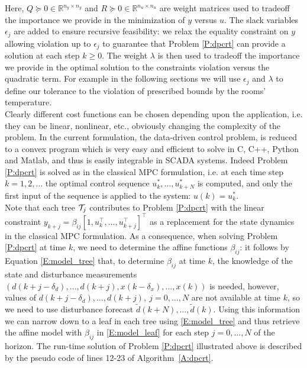 \textcolor[rgb]{0,0,1}{Here, $Q \succeq 0 \in \mathbb{R}^{n_y\times n_y}$ and $R \succeq 0 \in \mathbb{R}^{n_u\times n_u}$ are weight matrices used to tradeoff the importance we provide in the minimization of $y$ versus $u$. The slack variables $\epsilon_j$ are added to ensure recursive feasibility: we relax the equality constraint on $y$ allowing violation up to $\epsilon_j$ to guarantee that Problem \ref{P:dpcrt} can provide a solution at each step $k \geq 0$. The weight $\lambda$ is then used to tradeoff the importance we provide in the optimal solution to the constraints violation versus the quadratic term. For example in the following sections we will use $\epsilon_j$ and $\lambda$ to define our tolerance to the violation of prescribed bounds by the rooms' temperature.\\
Clearly different cost functions can be chosen depending upon the application, i.e. they can be linear, nonlinear, etc., obviously changing the complexity of the problem. In the current formulation, the data-driven control problem, is reduced to a convex program which is very easy and efficient to solve in C, C++, Python and Matlab, and thus is easily integrable in SCADA systems. Indeed Problem \ref{P:dpcrt} is solved as in the classical MPC formulation, i.e. at each time step $k=1,2,\ldots$ the optimal control sequence $u^*_k,\ldots,u^*_{k+N}$ is computed, and only the first input of the sequence is applied to the system: $u(k) = u^*_k$.\\
Note that each tree $\mathcal{T}_j$ contributes to Problem  \ref{P:dpcrt} with the linear constraint $y_{k+j} = \beta_{ij} [1,u^\top_{k},\ldots,u^\top_{k+j} ]^\top$ as a replacement for the state dynamics in the classical MPC formulation. As a consequence, when solving Problem \ref{P:dpcrt} at time $k$, we need to determine the affine functions $\beta_{ij}$: it follows by Equation \eqref{E:model_tree} that, to determine $\beta_{ij}$ at time $k$, the knowledge of the state and disturbance measurements $\left( d(k+j-\delta_d),\ldots,d(k+j),x(k-\delta_x),\ldots,x(k) \right)$ is needed, however, values of $d(k+j-\delta_d),\ldots,d(k+j),\ j=0,\ldots,N$ are not available at time $k$, so we need to use disturbance forecast $\tilde d(k+N),\ldots,\tilde d(k)$. Using this information we can narrow down to a leaf in each tree using \eqref{E:model_tree} and thus retrieve the affine model with $\beta_{ij}$ in \eqref{E:model_leaf} for each step $j=0,\ldots,N$ of the horizon. The run-time solution of Problem \ref{P:dpcrt} illustrated above is described by the pseudo code of lines 12-23 of Algorithm~\ref{A:dpcrt}.}

